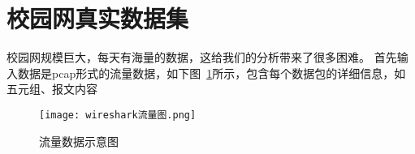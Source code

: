 \section{校园网真实数据集}
校园网规模巨大，每天有海量的数据，这给我们的分析带来了很多困难。
首先输入数据是pcap形式的流量数据，如下图~\ref{fig:wireshark}所示，包含每个数据包的详细信息，如五元组、报文内容

\begin{figure}
    \centering
    \texttt{[image: wireshark流量图.png]}
    \caption{流量数据示意图}
    \label{fig:wireshark}
  \end{figure}
